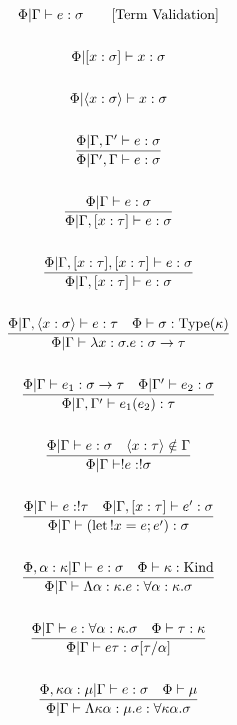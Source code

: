 \documentclass {article}
\begin{document}
\begin{gather*}
\Phi | \Gamma \vdash e : \sigma \tag* {[\text{Term Validation}]}  \\
\\
\Phi | [x : \sigma] \vdash x : \sigma \\
\\
\Phi | \langle x : \sigma \rangle \vdash x : \sigma \\
\\
\frac
{\Phi | \Gamma, \Gamma' \vdash e : \sigma}
{\Phi | \Gamma', \Gamma \vdash e : \sigma} \\
\\
\frac
{\Phi | \Gamma \vdash e : \sigma}
{\Phi | \Gamma, [ x : \tau ] \vdash e : \sigma } \\
\\
\frac
{\Phi | \Gamma, [x : \tau], [x : \tau] \vdash e : \sigma}
{\Phi | \Gamma, [x : \tau] \vdash e : \sigma } \\
\\
\frac
{\Phi | \Gamma, \langle x : \sigma \rangle \vdash e : \tau \quad \Phi \vdash \sigma : \text{Type} (\kappa)}
{\Phi | \Gamma \vdash \lambda x:\sigma. e : \sigma \to \tau } \\
\\
\frac
{\Phi | \Gamma \vdash e_1 : \sigma \to \tau \quad \Phi | \Gamma' \vdash e_2 : \sigma}
{\Phi | \Gamma, \Gamma' \vdash e_1(e_2) : \tau} \\
\\
\frac
{\Phi | \Gamma \vdash e : \sigma \quad \langle x : \tau \rangle \notin \Gamma }
{\Phi | \Gamma \vdash !e : !\sigma } \\
\\
\frac
{\Phi | \Gamma \vdash e : !\tau \quad \Phi | \Gamma, [x : \tau] \vdash e' : \sigma }
{\Phi | \Gamma \vdash (\text{let} \, !x = e; e') : \sigma}  \\
\\
\frac
{\Phi, \alpha : \kappa | \Gamma \vdash e : \sigma \quad \Phi \vdash \kappa : \text{Kind}}
{\Phi | \Gamma \vdash \Lambda \alpha : \kappa. e : \forall \alpha : \kappa. \sigma } \\
\\
\frac
{\Phi | \Gamma \vdash e : \forall \alpha : \kappa. \sigma \quad \Phi \vdash \tau : \kappa }
{\Phi | \Gamma \vdash e \tau : \sigma [\tau/\alpha] } \\
\\
\frac
{\Phi, \kappa \alpha : \mu | \Gamma \vdash e : \sigma \quad \Phi \vdash \mu}
{\Phi | \Gamma \vdash \Lambda \kappa \alpha : \mu. e : \forall \kappa \alpha. \sigma} \\

\end{gather*}
\end{document}
